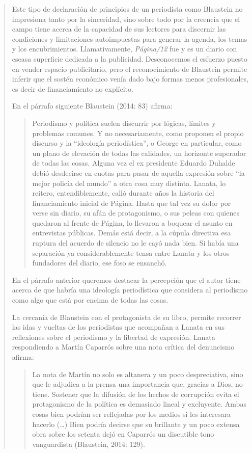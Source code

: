 \begin{quote}
Este tipo de declaración de principios de un periodista como Blaustein no impresiona tanto por la sinceridad, sino sobre todo por la creencia que el campo tiene acerca de la capacidad de sus lectores para discernir las condiciones y limitaciones autoimpuestas para generar la agenda, los temas y los encubrimientos. Llamativamente, \emph{Página/12} fue y es un diario con escasa superficie dedicada a la publicidad. Desconocemos el esfuerzo puesto en vender espacio publicitario, pero el reconocimiento de Blaustein permite inferir que el sostén económico venía dado bajo formas menos profesionales, es decir de financiamiento no explícito.

En el párrafo siguiente Blaustein (2014: 83) afirma:

\begin{quote}
	Periodismo y política suelen discurrir por lógicas, límites y problemas comunes. Y no necesariamente, como proponen el propio discurso y la \enquote{ideología periodística}, o George en particular, como un plano de elevación de todas las calidades, un horizonte superador de todas las cosas. Alguna vez el ex presidente Eduardo Duhalde debió desdecirse en cuotas para pasar de aquella expresión sobre \enquote{la mejor policía del mundo} a otra cosa muy distinta. Lanata, lo reitero, entendiblemente, calló durante años la historia del financiamiento inicial de Página. Hasta que tal vez su dolor por verse sin diario, su afán de protagonismo, o sus peleas con quienes quedaron al frente de Página, lo llevaron a boquear el asunto en entrevistas públicas. Demás está decir, a la cúpula directiva esa ruptura del acuerdo de silencio no le cayó nada bien. Si había una separación ya considerablemente tensa entre Lanata y los otros fundadores del diario, ese foso se ensanchó.
\end{quote}


En el párrafo anterior queremos destacar la percepción que el autor tiene acerca de que habría una ideología periodística que considera al periodismo como algo que está por encima de todas las cosas.

La cercanía de Blaustein con el protagonista de su libro, permite recorrer las idas y vueltas de los periodistas que acompañan a Lanata en sus reflexiones sobre el periodismo y la libertad de expresión. Lanata respondiendo a Martín Caparrós sobre una nota crítica del denuncismo afirma:

\begin{quote}
	La nota de Martín no solo es altanera y un poco despreciativa, sino que le adjudica a la prensa una importancia que, gracias a Dios, no tiene. Sostener que la difusión de los hechos de corrupción evita el protagonismo de la política es demasiado lineal y excluyente. Ambas cosas bien podrían ser reflejadas por los medios si les interesara hacerlo (\dots) Bien podría decirse que su brillante y un poco extensa obra sobre los setenta dejó en Caparrós un discutible tono vanguardista (Blaustein, 2014: 129).
\end{quote}



\end{quote}
